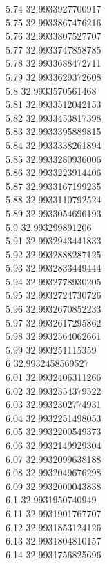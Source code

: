 {5.74	32.9933927700917\\
5.75	32.9933867476216\\
5.76	32.9933807527707\\
5.77	32.9933747858785\\
5.78	32.9933688472711\\
5.79	32.9933629372608\\
5.8	32.9933570561468\\
5.81	32.9933512042153\\
5.82	32.9933453817398\\
5.83	32.9933395889815\\
5.84	32.9933338261894\\
5.85	32.9933280936006\\
5.86	32.9933223914406\\
5.87	32.9933167199235\\
5.88	32.9933110792524\\
5.89	32.9933054696193\\
5.9	32.993299891206\\
5.91	32.9932943441833\\
5.92	32.9932888287125\\
5.93	32.9932833449444\\
5.94	32.9932778930205\\
5.95	32.9932724730726\\
5.96	32.9932670852233\\
5.97	32.9932617295862\\
5.98	32.9932564062661\\
5.99	32.993251115359\\
6	32.9932458569527\\
6.01	32.9932406311266\\
6.02	32.9932354379522\\
6.03	32.9932302774931\\
6.04	32.9932251498053\\
6.05	32.9932200549373\\
6.06	32.9932149929304\\
6.07	32.9932099638188\\
6.08	32.9932049676298\\
6.09	32.9932000043838\\
6.1	32.9931950740949\\
6.11	32.9931901767707\\
6.12	32.9931853124126\\
6.13	32.9931804810157\\
6.14	32.9931756825696\\
}
